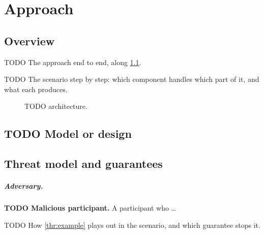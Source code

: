 \chapter{Approach}\label{ch:approach}

\section{Overview}
TODO The approach end to end, along \cref{fig:architecture}.
\begin{runningexample}
TODO The scenario step by step: which component handles which part of it, and what each produces.
\end{runningexample}

\begin{figure}[!ht]
  \centering
  \caption{TODO architecture.}
  \label{fig:architecture}
\end{figure}

\section{TODO Model or design}

\section{Threat model and guarantees}

\paragraph{Adversary.}
\begin{threats}
  \item\label{thr:example} \textbf{TODO Malicious participant.} A participant who \dots
\end{threats}

\begin{runningexample}
TODO How \cref{thr:example} plays out in the scenario, and which guarantee stops it.
\end{runningexample}

